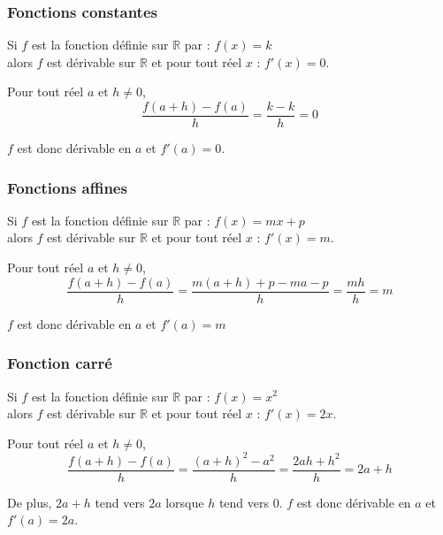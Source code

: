 \documentclass[french]{book}
\newcommand{\R}{\mathbb {R}}
\begin{document}
\subsubsection*{Fonctions constantes}
\begin{prop}

Si $f$ est la fonction définie sur $\R$ par :  $f(x)=k$ \\
alors $f$ est dérivable sur $\R$ et pour tout réel $x$ :  $f'(x)=0$.

\end{prop}

\begin{demo}
Pour tout réel $a$ et $h\neq 0$, 
\[\dfrac{f(a+h)-f(a)}{h}=\dfrac{k-k}{h}=0\]

$f$ est donc dérivable en $a$ et $f'(a)=0$.
\end{demo}

\subsubsection*{Fonctions affines}
\begin{prop}
Si $f$ est la fonction définie sur $\R$ par :  $f(x)=mx+p$ \\
alors $f$ est dérivable sur $\R$ et pour tout réel $x$ :  $f'(x)=m$.
\end{prop}

\begin{demo}
Pour tout réel $a$ et $h\neq 0$,
\[\dfrac{f(a+h)-f(a)}{h}=\dfrac{m(a+h)+p-ma-p}{h}=\dfrac{mh}{h}=m\]

$f$ est donc dérivable en $a$ et $f'(a)=m$
\end{demo}

\subsubsection*{Fonction carré}
\begin{prop}
Si $f$ est la fonction définie sur $\R$ par :  $f(x)=x^{2}$ \\
alors $f$ est dérivable sur $\R$ et pour tout réel $x$ :  $f'(x)=2x$.

\end{prop}

\begin{demo}
Pour tout réel $a$ et $h\neq 0$,
\[\dfrac{f(a+h)-f(a)}{h}=\dfrac{(a+h)^{2}-a^{2}}{h}=\dfrac{2ah+h^{2}}{h}=2a+h\]

De plus, $2a+h$ tend vers $2a$ lorsque $h$ tend vers 0.
$f$ est donc dérivable en $a$ et $f'(a)=2a$.
\end{demo}
\end{document}
